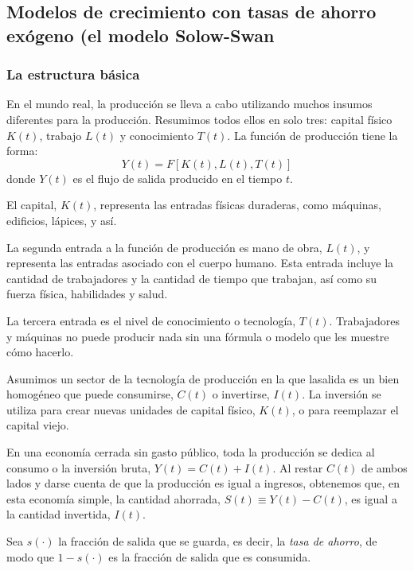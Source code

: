 \subsection{Modelos de crecimiento con tasas de ahorro exógeno (el modelo Solow-Swan}

\subsubsection{La estructura básica}

En el mundo real, la producción se lleva a cabo utilizando muchos insumos diferentes para la producción. Resumimos todos ellos en solo tres: capital físico $K\left(t\right)$, trabajo $L\left(t\right)$ y conocimiento $T\left(t\right)$. La función de producción tiene la forma:
\begin{equation}
Y\left(t\right)=F\left[K\left(t\right), L\left(t\right), T\left(t\right)\right]
\end{equation}
donde $Y(t)$ es el flujo de salida producido en el tiempo $t$.

El capital, $K\left(t\right)$, representa las entradas físicas duraderas, como máquinas, edificios, lápices, y así.

La segunda entrada a la función de producción es mano de obra, $L\left(t\right)$, y representa las entradas asociado con el cuerpo humano. Esta entrada incluye la cantidad de trabajadores y la cantidad de tiempo que trabajan, así como su fuerza física, habilidades y salud.

La tercera entrada es el nivel de conocimiento o tecnología, $T\left(t\right)$. Trabajadores y máquinas no puede producir nada sin una fórmula o modelo que les muestre cómo hacerlo.

Asumimos un sector de la tecnología de producción en la que lasalida es un bien homogéneo que puede consumirse, $C\left(t\right)$ o invertirse, $I\left(t\right)$. La inversión se utiliza para crear nuevas unidades de capital físico, $K\left(t\right)$, o para reemplazar el capital viejo.

En una economía cerrada sin gasto público, toda la producción se dedica al consumo o la inversión bruta, $Y\left(t\right)=C\left(t\right)+I\left(t\right)$. Al restar $C\left(t\right)$ de ambos lados y darse cuenta de que la producción es igual a ingresos, obtenemos que, en esta economía simple, la cantidad ahorrada, $S\left(t\right)\equiv Y\left(t\right)-C\left(t\right)$, es igual a la cantidad invertida, $I\left(t\right)$.

Sea $s\left(\cdot\right)$ la fracción de salida que se guarda, es decir, la \emph{tasa de ahorro}, de modo que $1-s\left(\cdot\right)$ es la fracción de salida que es consumida. 

